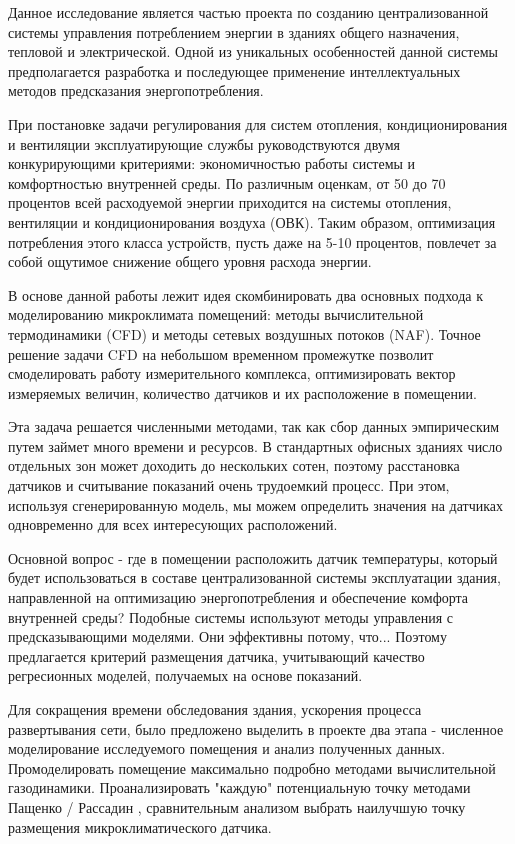 
Данное исследование является частью проекта по созданию централизованной системы управления потреблением энергии в зданиях общего назначения, тепловой и электрической. Одной из уникальных особенностей данной системы предполагается разработка и последующее применение интеллектуальных методов предсказания энергопотребления.

При постановке задачи регулирования для систем отопления, кондиционирования и вентиляции эксплуатирующие службы руководствуются двумя конкурирующими критериями: экономичностью работы системы и комфортностью внутренней среды. По различным оценкам, от 50 до 70 процентов всей расходуемой энергии приходится на системы отопления, вентиляции и кондиционирования воздуха (ОВК). Таким образом, оптимизация потребления этого класса устройств, пусть даже на 5-10 процентов, повлечет за собой ощутимое снижение общего уровня расхода энергии. 

В основе данной работы лежит идея скомбинировать два основных подхода к моделированию микроклимата помещений: методы вычислительной термодинамики (CFD) и методы сетевых воздушных потоков (NAF). Точное решение задачи CFD на небольшом временном промежутке позволит смоделировать работу измерительного комплекса, оптимизировать вектор измеряемых величин, количество датчиков и их расположение в помещении. 

Эта задача решается численными методами, так как сбор данных эмпирическим путем займет много времени и ресурсов. В стандартных офисных зданиях число отдельных зон может доходить до нескольких сотен, поэтому расстановка датчиков и считывание показаний очень трудоемкий процесс. При этом, используя сгенерированную модель, мы можем определить значения на датчиках одновременно для всех интересующих расположений.


\newpage


Основной вопрос - где в помещении расположить датчик температуры, который будет использоваться в составе централизованной системы эксплуатации здания, направленной на оптимизацию энергопотребления и обеспечение комфорта внутренней среды? Подобные системы используют методы управления с предсказывающими моделями. Они эффективны потому, что... Поэтому предлагается критерий размещения датчика, учитывающий качество регресионных моделей, получаемых на основе показаний. 

Для сокращения времени обследования здания, ускорения процесса развертывания сети, было предложено выделить в проекте два этапа - численное моделирование исследуемого помещения и анализ полученных данных. Промоделировать помещение максимально подробно  методами вычислительной газодинамики. Проанализировать "каждую" потенциальную точку методами Пащенко / Рассадин \cite{indent}, сравнительным анализом выбрать наилучшую точку размещения микроклиматического датчика.

